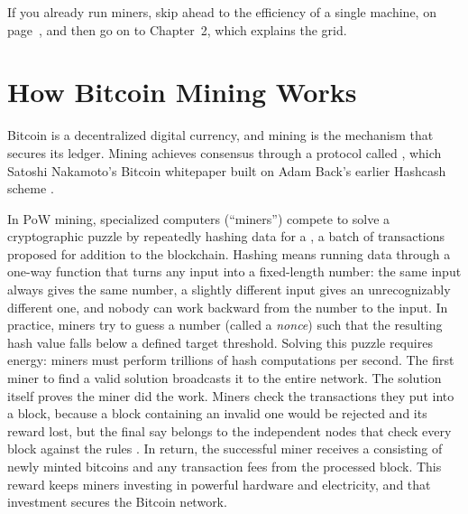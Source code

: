 If you already run miners, skip ahead to the efficiency of a single machine, on page~\pageref{par:ch1-efficiency}, and then go on to Chapter~2, which explains the grid.

\section{How Bitcoin Mining Works}

Bitcoin is a decentralized digital currency, and mining is the mechanism that secures its ledger. Mining achieves consensus through a protocol called , which Satoshi Nakamoto's Bitcoin whitepaper built on Adam Back's earlier Hashcash scheme \autocite{Nakamoto2008}. %

In PoW mining, specialized computers (``miners'') compete to solve a cryptographic puzzle by repeatedly hashing data for a , a batch of transactions proposed for addition to the blockchain. Hashing means running data through a one-way function that turns any input into a fixed-length number: the same input always gives the same number, a slightly different input gives an unrecognizably different one, and nobody can work backward from the number to the input. In practice, miners try to guess a number (called a \textit{nonce}) such that the resulting hash value falls below a defined target threshold. Solving this puzzle requires energy: miners must perform trillions of hash computations per second. The first miner to find a valid solution broadcasts it to the entire network. The solution itself proves the miner did the work. Miners check the transactions they put into a block, because a block containing an invalid one would be rejected and its reward lost, but the final say belongs to the independent nodes that check every block against the rules \autocite{Nakamoto2008}. %
In return, the successful miner receives a  consisting of newly minted bitcoins and any transaction fees from the processed block. This reward keeps miners investing in powerful hardware and electricity, and that investment secures the Bitcoin network.

